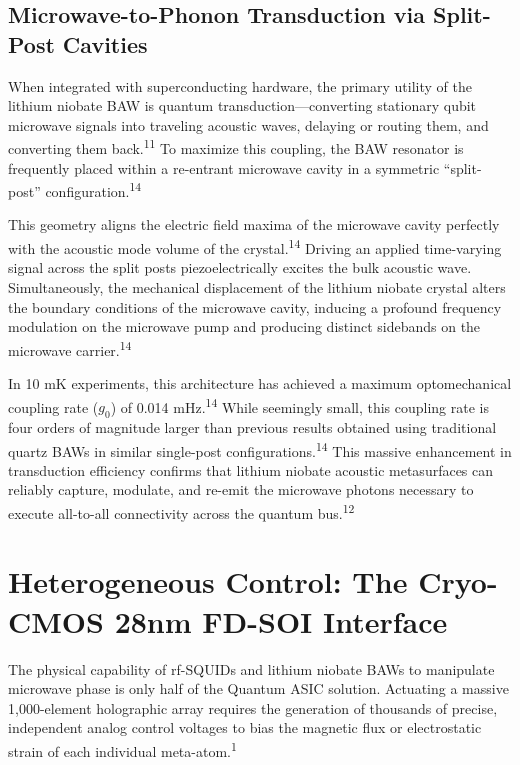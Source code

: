 \documentclass[11pt, a4paper]{article}
\begin{document}
\subsection*{Microwave-to-Phonon Transduction via Split-Post Cavities}

When integrated with superconducting hardware, the primary utility of the lithium niobate BAW is quantum transduction---converting stationary qubit microwave signals into traveling acoustic waves, delaying or routing them, and converting them back.\textsuperscript{11} To maximize this coupling, the BAW resonator is frequently placed within a re-entrant microwave cavity in a symmetric ``split-post'' configuration.\textsuperscript{14}

This geometry aligns the electric field maxima of the microwave cavity perfectly with the acoustic mode volume of the crystal.\textsuperscript{14} Driving an applied time-varying signal across the split posts piezoelectrically excites the bulk acoustic wave. Simultaneously, the mechanical displacement of the lithium niobate crystal alters the boundary conditions of the microwave cavity, inducing a profound frequency modulation on the microwave pump and producing distinct sidebands on the microwave carrier.\textsuperscript{14}

In 10 mK experiments, this architecture has achieved a maximum optomechanical coupling rate ($g_0$) of 0.014 mHz.\textsuperscript{14} While seemingly small, this coupling rate is four orders of magnitude larger than previous results obtained using traditional quartz BAWs in similar single-post configurations.\textsuperscript{14} This massive enhancement in transduction efficiency confirms that lithium niobate acoustic metasurfaces can reliably capture, modulate, and re-emit the microwave photons necessary to execute all-to-all connectivity across the quantum bus.\textsuperscript{12}

\section*{Heterogeneous Control: The Cryo-CMOS 28nm FD-SOI Interface}

The physical capability of rf-SQUIDs and lithium niobate BAWs to manipulate microwave phase is only half of the Quantum ASIC solution. Actuating a massive 1,000-element holographic array requires the generation of thousands of precise, independent analog control voltages to bias the magnetic flux or electrostatic strain of each individual meta-atom.\textsuperscript{1}
\end{document}
